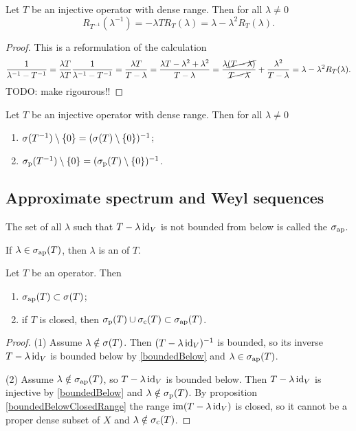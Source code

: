 \begin{proposition}
Let $T$ be an injective operator with dense range. Then for all $\lambda\neq 0$
\[ R_{T^{-1}}(\lambda^{-1}) = -\lambda T R_{T}(\lambda) = \lambda -\lambda^2 R_T(\lambda). \]
\end{proposition}
\begin{proof}
This is a reformulation of the calculation
\[ \frac{1}{\lambda^{-1} - T^{-1}} = \frac{\lambda T}{\lambda T}\frac{1}{\lambda^{-1} - T^{-1}} = \frac{\lambda T}{T - \lambda} = \frac{\lambda T - \lambda^2 + \lambda^2}{T - \lambda} = \frac{\lambda\cancel{(T - \lambda)}}{\cancel{T - \lambda}} + \frac{\lambda^2}{T - \lambda} = \lambda - \lambda^2 R_T(\lambda). \]
TODO: make rigourous!!
\end{proof}
\begin{corollary}
Let $T$ be an injective operator with dense range. Then for all $\lambda\neq 0$
\begin{enumerate}
\item $\sigma(T^{-1})\setminus\{0\} = (\sigma(T)\setminus \{0\})^{-1}$;
\item $\sigma_\text{p}(T^{-1})\setminus\{0\} = (\sigma_\text{p}(T)\setminus \{0\})^{-1}$.
\end{enumerate}
\end{corollary}

\subsection{Approximate spectrum and Weyl sequences}
\begin{definition}
The set of all $\lambda$ such that $T-\lambda \operatorname{id}_V$ is not bounded from below is called the  $\sigma_\text{ap}$.

If $\lambda\in\sigma_\text{ap}(T)$, then $\lambda$ is an  of $T$.
\end{definition}

\begin{proposition} \label{approximateSpectrum}
Let $T$ be an operator. Then
\begin{enumerate}
\item $\sigma_\text{ap}(T) \subset \sigma(T)$;
\item if $T$ is closed, then $\sigma_\text{p}(T)\cup\sigma_\text{c}(T)\subset\sigma_\text{ap}(T)$.
\end{enumerate}
\end{proposition}
\begin{proof}
(1) Assume $\lambda \notin \sigma(T)$. Then $(T-\lambda \operatorname{id}_V)^{-1}$ is bounded, so its inverse $T-\lambda \operatorname{id}_V$ is bounded below by \ref{boundedBelow} and $\lambda\in \sigma_\text{ap}(T)$.

(2) Assume $\lambda\notin \sigma_\text{ap}(T)$, 
so $T-\lambda \operatorname{id}_V$ is bounded below. Then $T-\lambda \operatorname{id}_V$ is injective by \ref{boundedBelow} and $\lambda\notin\sigma_\text{p}(T)$. By proposition \ref{boundedBelowClosedRange} the range $\operatorname{im}(T-\lambda \operatorname{id}_V)$ is closed, so it cannot be a proper dense subset of $X$ and $\lambda\notin\sigma_\text{c}(T)$.
\end{proof}

